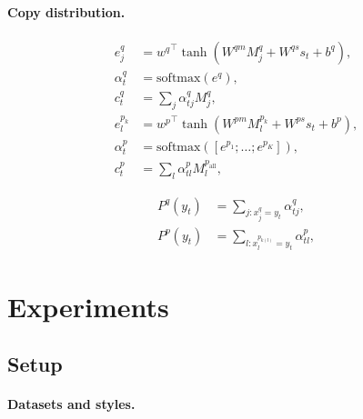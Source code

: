 \documentclass[11pt,a4paper]{article}
\theoremstyle{mydef}
\theoremstyle{myprob}
\begin{document}
\paragraph{Copy distribution.}

\begin{align}
e^q_j &= {w^q}^\top \tanh(W^{qm} M_j^q + W^{qs} s_t +b^q), \\
\alpha^q_t &= \mathrm{softmax}(e^q), \\
c^q_t &= \textstyle \sum_j \alpha^q_{tj} M_j^q, \\
e^{p_k}_l &= {w^p}^\top \tanh(W^{pm} M_l^{p_k} + W^{ps} s_t +b^p), \\
\alpha^p_t &= \mathrm{softmax}([e^{p_1}; \ldots; e^{p_K}]), \\
c^p_t &=  \textstyle \sum_{l} \alpha^p_{tl} M^{p_\mathrm{all}}_{l},
\end{align}

\begin{align}
P^q(y_t) &=  \textstyle \sum_{j: x^q_j = y_t} \alpha^q_{tj}, \\
P^p(y_t) &= \textstyle \sum_{l: x^{p_{k(l)}}_{l} = y_t} \alpha^p_{tl},
\end{align}

\section{Experiments}

\subsection{Setup}

\paragraph{Datasets and styles.}
\end{document}
